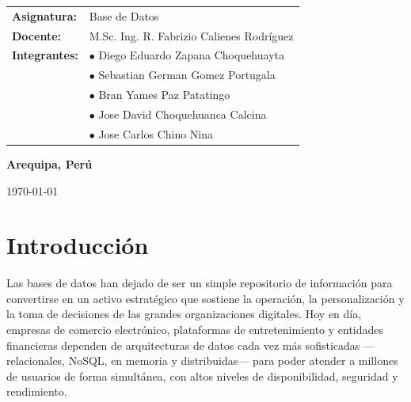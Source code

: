 \documentclass[12pt,a4paper]{article}
\begin{document}
\begin{titlepage}
\begin{minipage}{0.92\textwidth}
    \vspace{1.3cm}

    \begin{flushleft}
      \hspace*{0.5cm}
      \begin{tabular}{ll}
        \textbf{\color{lasalledark} Asignatura:} & Base de Datos \\[0.1cm]                                                                                                
        \textbf{\color{lasalledark} Docente:}    & M.Sc. Ing. R. Fabrizio Calienes Rodríguez \\[0.1cm]
        \textbf{\color{lasalledark} Integrantes:} & \(\bullet\) Diego Eduardo Zapana Choquehuayta \\
                                                   & \(\bullet\) Sebastian German Gomez Portugala \\
                                                   & \(\bullet\) Bran Yames Paz Patatingo \\
                                                   & \(\bullet\) Jose David Choquehuanca Calcina \\
                                                   & \(\bullet\) Jose Carlos Chino Nina \\
      \end{tabular}
    \end{flushleft}

    \vfill

    \vspace{1.2cm}
    {\large\bfseries\color{lasalledark} Arequipa, Perú\par}
    \vspace{0.15cm}
    {\small\color{gray} \today\par}
  \end{minipage}
\end{titlepage}


\section{Introducción}
Las bases de datos han dejado de ser un simple repositorio de información para
convertirse en un activo estratégico que sostiene la operación, la
personalización y la toma de decisiones de las grandes organizaciones
digitales. Hoy en día, empresas de comercio electrónico, plataformas de
entretenimiento y entidades financieras dependen de arquitecturas de datos
cada vez más sofisticadas —relacionales, NoSQL, en memoria y distribuidas—
para poder atender a millones de usuarios de forma simultánea, con altos
niveles de disponibilidad, seguridad y rendimiento.
\end{document}
